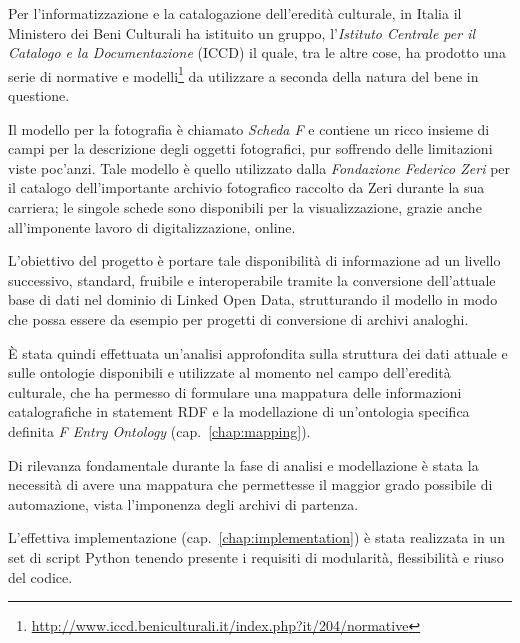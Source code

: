 Per l'informatizzazione e la catalogazione dell'eredità culturale, in Italia il Ministero dei Beni Culturali ha istituito un gruppo, l'\emph{Istituto Centrale per il Catalogo e la Documentazione} (ICCD) il quale, tra le altre cose, ha prodotto una serie di normative e modelli\footnote{\url{http://www.iccd.beniculturali.it/index.php?it/204/normative}} da utilizzare a seconda della natura del bene in questione.

Il modello per la fotografia è chiamato \emph{Scheda F} e contiene un ricco insieme di campi per la descrizione degli oggetti fotografici, pur soffrendo delle limitazioni viste poc'anzi. Tale modello è quello utilizzato dalla \emph{Fondazione Federico Zeri} per il catalogo dell'importante archivio fotografico raccolto da Zeri durante la sua carriera; le singole schede sono disponibili per la visualizzazione, grazie anche all'imponente lavoro di digitalizzazione, online.

L'obiettivo del progetto è portare tale disponibilità di informazione ad un livello successivo, standard, fruibile e interoperabile tramite la conversione dell'attuale base di dati nel dominio di Linked Open Data, strutturando il modello in modo che possa essere da esempio per progetti di conversione di archivi analoghi.

È stata quindi effettuata un'analisi approfondita sulla struttura dei dati attuale e sulle ontologie disponibili e utilizzate al momento nel campo dell'eredità culturale, che ha permesso di formulare una mappatura delle informazioni catalografiche in statement RDF e la modellazione di un'ontologia specifica definita \emph{F Entry Ontology} (cap.~\ref{chap:mapping}).

Di rilevanza fondamentale durante la fase di analisi e modellazione è stata la necessità di avere una mappatura che permettesse il maggior grado possibile di automazione, vista l'imponenza degli archivi di partenza.

L'effettiva implementazione (cap.~\ref{chap:implementation}) è stata realizzata in un set di script Python tenendo presente i requisiti di modularità, flessibilità e riuso del codice.
